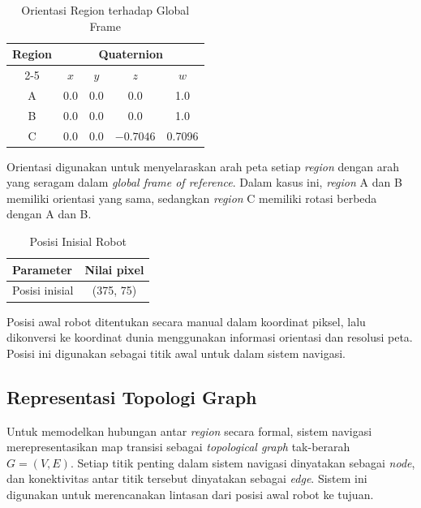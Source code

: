 \begin{table}[H]
\centering
\caption{Orientasi Region terhadap Global Frame}
\label{tab:orientations}
\begin{tabular}{ccccc}
\toprule
\textbf{Region} & \multicolumn{4}{c}{\textbf{Quaternion}} \\
\cmidrule{2-5}
 & $x$ & $y$ & $z$ & $w$ \\
\midrule
A & 0.0    & 0.0    & 0.0     & 1.0    \\
B & 0.0    & 0.0    & 0.0     & 1.0    \\
C & 0.0    & 0.0    & $-0.7046$ & 0.7096 \\
\bottomrule
\end{tabular}
\end{table}

Orientasi digunakan untuk menyelaraskan arah peta setiap \emph{region} dengan arah yang seragam dalam \emph{global frame of reference}. Dalam kasus ini, \emph{region} A dan B memiliki orientasi yang sama, sedangkan \emph{region} C memiliki rotasi berbeda dengan A dan B.

\begin{table}[H]
\centering
\caption{Posisi Inisial Robot}
\label{tab:initial_pose}
\begin{tabular}{lc}
\toprule
\textbf{Parameter} & \textbf{Nilai pixel} \\
\midrule
Posisi inisial & (375, 75) \\
\bottomrule
\end{tabular}
\end{table}

Posisi awal robot ditentukan secara manual dalam koordinat piksel, lalu dikonversi ke koordinat dunia menggunakan informasi orientasi dan resolusi peta. Posisi ini digunakan sebagai titik awal untuk dalam sistem navigasi.

\subsection{Representasi Topologi Graph}
\label{sec:topologi_graph}

Untuk memodelkan hubungan antar \emph{region} secara formal, sistem navigasi
merepresentasikan map transisi sebagai \emph{topological graph} tak-berarah
$G = (V, E)$. Setiap titik penting dalam sistem navigasi dinyatakan sebagai
\emph{node}, dan konektivitas antar titik tersebut dinyatakan sebagai \emph{edge}. Sistem ini digunakan untuk merencanakan lintasan dari posisi awal robot ke tujuan.

